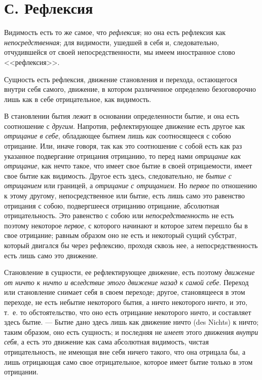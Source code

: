 \section[С. Рефлексия]{С. Рефлексия}
Видимость есть то же самое, что
{\em рефлексия}; но она есть рефлексия как
{\em непосредственная}; для видимости, ушедшей в себя
и, следовательно, отчудившейся от своей непосредственности, мы имеем
иностранное слово <<рефлексия>>.

Сущность есть рефлексия, движение становления и перехода, остающегося внутри
себя самого, движение, в котором различенное определено безоговорочно лишь
как в себе отрицательное, как видимость.

В становлении бытия лежит в основании определенности бытие, и она есть
соотношение с {\em другим}. Напротив, рефлектирующее
движение есть другое как {\em отрицание в себе},
обладающее бытием лишь {\em как} соотносящееся с собою
отрицание. Или, иначе говоря, так как это соотношение с собой есть как раз
указанное подвергание отрицания отрицанию, то перед нами
{\em отрицание как отрицание}, как нечто такое, что
имеет свое бытие в своей отрицаемости, имеет свое бытие как видимость.
Другое есть здесь, следовательно, не {\em бытие с
отрицанием} или границей, а {\em отрицание с
отрицанием}. Но {\em первое} по отношению к этому
другому, непосредственное или бытие, есть лишь само это равенство отрицания
с собою, подвергшееся отрицанию отрицание, абсолютная отрицательность. Это
равенство с собою или {\em непосредственность} не есть
поэтому некоторое {\em первое}, с которого начинают и
которое затем перешло бы в свое отрицание; равным образом оно не есть и
некоторый сущий субстрат, который двигался бы через рефлексию, проходя
сквозь нее, а непосредственность есть лишь само это движение.

Становление в сущности, ее рефлектирующее движение, есть поэтому
{\em движение от ничто к ничто и вследствие этого
движение назад к самой себе}. Переход или становление снимает себя в своем
переходе; другое, становящееся в этом переходе, не есть небытие некоторого
бытия, а ничто некоторого ничто, и это, т.~е. то обстоятельство, что оно
есть отрицание некоторого ничто, и составляет здесь бытие. --- Бытие дано
здесь лишь как движение ничто (des Nichts) к ничто; таким образом, оно есть
сущность; и последняя не {\em имеет} этого движения
{\em внутри себя}, а есть это движение как сама
абсолютная видимость, чистая отрицательность, не имеющая вне себя ничего
такого, что она отрицала бы, а лишь отрицающая само свое отрицательное,
которое имеет бытие только в этом отрицании.

